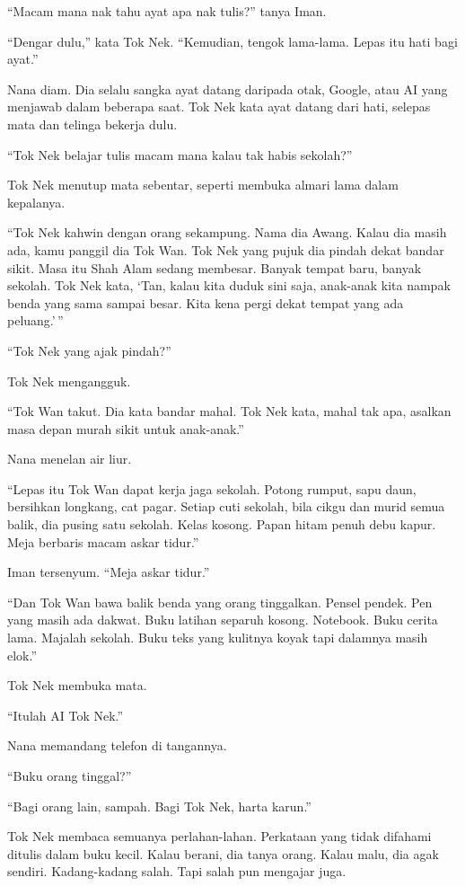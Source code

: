 \documentclass[
  11pt,
  a5paper,
  openany,
  oneside]{book}
\begin{document}
``Macam mana nak tahu ayat apa nak tulis?'' tanya Iman.

``Dengar dulu,'' kata Tok Nek. ``Kemudian, tengok lama-lama. Lepas itu
hati bagi ayat.''

Nana diam. Dia selalu sangka ayat datang daripada otak, Google, atau AI
yang menjawab dalam beberapa saat. Tok Nek kata ayat datang dari hati,
selepas mata dan telinga bekerja dulu.

``Tok Nek belajar tulis macam mana kalau tak habis sekolah?''

Tok Nek menutup mata sebentar, seperti membuka almari lama dalam
kepalanya.

``Tok Nek kahwin dengan orang sekampung. Nama dia Awang. Kalau dia masih
ada, kamu panggil dia Tok Wan. Tok Nek yang pujuk dia pindah dekat
bandar sikit. Masa itu Shah Alam sedang membesar. Banyak tempat baru,
banyak sekolah. Tok Nek kata, `Tan, kalau kita duduk sini saja,
anak-anak kita nampak benda yang sama sampai besar. Kita kena pergi
dekat tempat yang ada peluang.'\,''

``Tok Nek yang ajak pindah?''

Tok Nek mengangguk.

``Tok Wan takut. Dia kata bandar mahal. Tok Nek kata, mahal tak apa,
asalkan masa depan murah sikit untuk anak-anak.''

Nana menelan air liur.

``Lepas itu Tok Wan dapat kerja jaga sekolah. Potong rumput, sapu daun,
bersihkan longkang, cat pagar. Setiap cuti sekolah, bila cikgu dan murid
semua balik, dia pusing satu sekolah. Kelas kosong. Papan hitam penuh
debu kapur. Meja berbaris macam askar tidur.''

Iman tersenyum. ``Meja askar tidur.''

``Dan Tok Wan bawa balik benda yang orang tinggalkan. Pensel pendek. Pen
yang masih ada dakwat. Buku latihan separuh kosong. Notebook. Buku
cerita lama. Majalah sekolah. Buku teks yang kulitnya koyak tapi
dalamnya masih elok.''

Tok Nek membuka mata.

``Itulah AI Tok Nek.''

Nana memandang telefon di tangannya.

``Buku orang tinggal?''

``Bagi orang lain, sampah. Bagi Tok Nek, harta karun.''

Tok Nek membaca semuanya perlahan-lahan. Perkataan yang tidak difahami
ditulis dalam buku kecil. Kalau berani, dia tanya orang. Kalau malu, dia
agak sendiri. Kadang-kadang salah. Tapi salah pun mengajar juga.
\end{document}
